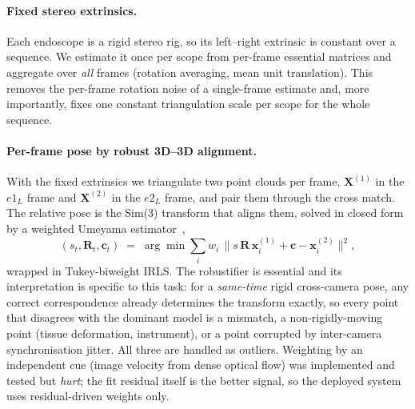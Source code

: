 \paragraph{Fixed stereo extrinsics.} Each endoscope is a rigid stereo rig, so its left--right extrinsic is
constant over a sequence. We estimate it once per scope from per-frame essential matrices and aggregate
over \emph{all} frames (rotation averaging, mean unit translation). This removes the per-frame rotation
noise of a single-frame estimate and, more importantly, fixes one constant triangulation scale per scope
for the whole sequence.

\paragraph{Per-frame pose by robust 3D--3D alignment.} With the fixed extrinsics we triangulate two point
clouds per frame, $\mathbf{X}^{(1)}$ in the $e1_L$ frame and $\mathbf{X}^{(2)}$ in the $e2_L$ frame, and
pair them through the cross match. The relative pose is the Sim(3) transform that aligns them, solved in
closed form by a weighted Umeyama estimator~\cite{umeyama1991},
\begin{equation}
  (s_t,\mathbf{R}_t,\mathbf{c}_t)\;=\;\arg\min \sum_i w_i\,\bigl\| s\,\mathbf{R}\,\mathbf{x}^{(1)}_i + \mathbf{c} - \mathbf{x}^{(2)}_i \bigr\|^2 ,
\end{equation}
wrapped in Tukey-biweight IRLS. The robustifier is essential and its interpretation is specific to this
task: for a \emph{same-time} rigid cross-camera pose, any correct correspondence already determines the
transform exactly, so every point that disagrees with the dominant model is a mismatch, a
non-rigidly-moving point (tissue deformation, instrument), or a point corrupted by inter-camera
synchronisation jitter. All three are handled as outliers. Weighting by an independent cue (image
velocity from dense optical flow) was implemented and tested but \emph{hurt}; the fit residual itself is
the better signal, so the deployed system uses residual-driven weights only.

